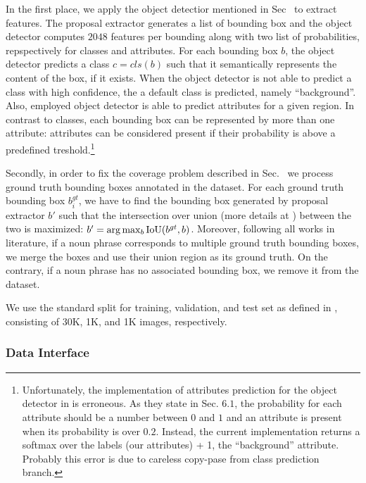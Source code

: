 In the first place, we apply the object detectior mentioned in
Sec~ to extract features. The proposal
extractor generates a list of bounding box and the object detector
computes $2048$ features per bounding along with two list of
probabilities, repspectively for classes and attributes. For each
bounding box $b$, the object detector predicts a class $c = cls(b)$
such that it semantically represents the content of the box, if it
exists. When the object detector is not able to predict a class with
high confidence, the a default class is predicted, namely
``background''. Also, employed object detector is able to predict
attributes for a given region. In contrast to classes, each bounding
box can be represented by more than one attribute: attributes can be
considered present if their probability is above a predefined
treshold.\footnote{Unfortunately, the implementation of attributes
prediction for the object detector in  is erroneous. As they state
in Sec. $6.1$, the probability for each attribute should be a number
between $0$ and $1$ and an attribute is present when its probability
is over $0.2$. Instead, the current implementation returns a softmax
over the labels (our attributes) + 1, the ``background'' attribute.
Probably this error is due to careless copy-pase from class prediction
branch.}

Secondly, in order to fix the coverage problem described in
Sec.~ we process ground truth bounding boxes
annotated in the dataset. For each ground truth bounding box
$b^{gt}_i$, we have to find the bounding box generated by proposal
extractor $b'$ such that the intersection over union (more details at
) between the two is maximized: $b' = \arg \max_{b}
\text{IoU}(b^{gt}, b)$. Moreover, following all works in literature, if a
noun phrase corresponds to multiple ground truth bounding boxes, we
merge the boxes and use their union region as its ground truth. On the
contrary, if a noun phrase has no associated bounding box, we remove
it from the dataset.

We use the standard split for training, validation, and test set as
defined in  , consisting of 30K, 1K,
and 1K images, respectively.

\subsubsection{Data Interface}
\label{subsec:data-interface}

